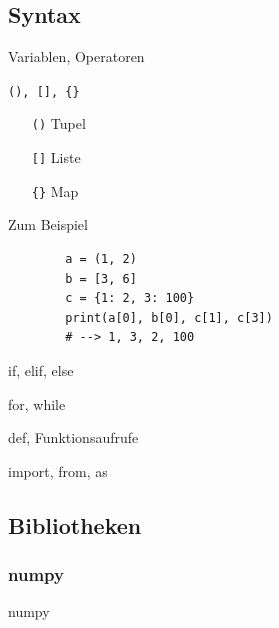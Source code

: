   \subsection{Syntax}
    \begin{frame}{Variablen, Operatoren}
    \end{frame}

\begin{frame}[fragile]{\texttt{(), [], \{\}}}
  \begin{itemize}
    \item[\texttt{()}] Tupel
    \item[\texttt{[]}] Liste
    \item[\texttt{\{\}}] Map 
  \end{itemize}
  \vspace{.5em}
  \begin{spacing}{1.0}
    \begin{exampleblock}{Zum Beispiel}
      \begin{verbatim}
        a = (1, 2)
        b = [3, 6]
        c = {1: 2, 3: 100}
        print(a[0], b[0], c[1], c[3])
        # --> 1, 3, 2, 100
      \end{verbatim}
    \end{exampleblock}
  \end{spacing}
\end{frame}

    \begin{frame}{if, elif, else}
    \end{frame}

    \begin{frame}{for, while}
    \end{frame}

    \begin{frame}{def, Funktionsaufrufe}
    \end{frame}

    \begin{frame}{import, from, as}
    \end{frame}

  \subsection{Bibliotheken}
    \subsubsection{numpy}
      \begin{frame}{numpy}
      \end{frame}

